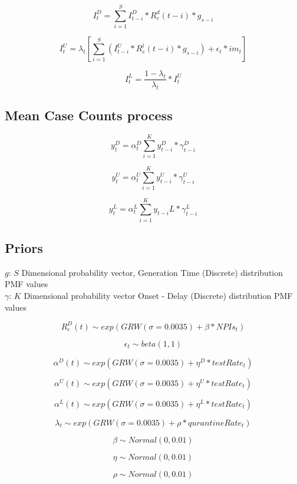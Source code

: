 \documentclass{article}
\begin{document}
$$I_t^D = \sum_{i=1}^{S} I_{t-i}^D * R_e^d(t-i) * g_{s-i} $$

$$I_t^U = \lambda_t \left[\sum_{i=1}^{S} (I_{t-i}^U * R_e^l(t-i)*g_{s-i}) + \epsilon_t * im_t \right] $$

$$I_t^L = \frac{1-\lambda_t}{\lambda_t} * I_t^U $$

\subsection{Mean Case Counts process}

$$y_t^D = \alpha_t^D \sum_{i=1}^{K} y_{t-i}^D*\gamma_{t-i}^D$$

$$y_t^U = \alpha_t^U \sum_{i=1}^{K} y_{t-i}^U*\gamma_{t-i}^U$$

$$y_t^L = \alpha_t^L \sum_{i=1}^{K} y_{t-i}L*\gamma_{t-i}^L$$

\subsection{Priors}
$g$: $S$ Dimensional probability vector, Generation Time (Discrete) distribution PMF values
\\
$\gamma$: $K$ Dimensional probability vector Onset - Delay (Discrete) distribution PMF values

$$R_e^D(t) \sim exp(GRW(\sigma=0.0035) + \beta*NPIs_t)$$

$$\epsilon_t \sim beta(1,1)$$

$$\alpha^D(t) \sim exp(GRW(\sigma=0.0035) + \eta^D*testRate_t)$$

$$\alpha^U(t) \sim exp(GRW(\sigma=0.0035) + \eta^U*testRate_t)$$

$$\alpha^L(t) \sim exp(GRW(\sigma=0.0035) + \eta^L*testRate_t)$$

$$\lambda_t \sim exp(GRW(\sigma=0.0035) + \rho*qurantineRate_t)$$

$$\beta \sim Normal(0,0.01)$$

$$\eta \sim Normal(0,0.01)$$

$$\rho \sim Normal(0,0.01)$$
\end{document}
